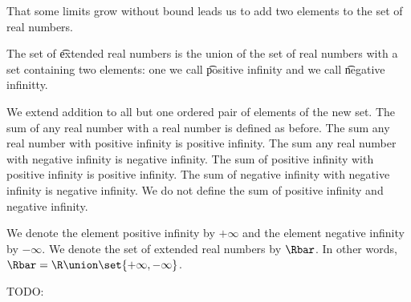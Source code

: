 

That some limits grow without bound leads us to add two elements to the set of real numbers.


The set of
\t{extended real numbers}
is the union of
the set of real numbers
with a set containing
two elements:
one we call
\t{positive infinity}
and we call
\t{negative infinitty}.


We extend addition to all
but one ordered pair of elements
of the new set.
The sum of any real number with
a real number is defined as before.
The sum any real number with positive
infinity is positive infinity.
The sum any real number with negative
infinity is negative infinity.
The sum of positive infinity with
positive infinity is positive infinity.
The sum of negative infinity with
negative infinity is negative infinity.
We do not define the sum of
positive infinity and negative infinity.



We denote the element positive infinity by $+\infty$ and the element negative infinity by $-\infty$.
We denote the set of extended real numbers by $\Rbar$.
In other words, $\Rbar = \R \union \set{+\infty,-\infty}$.


TODO:
